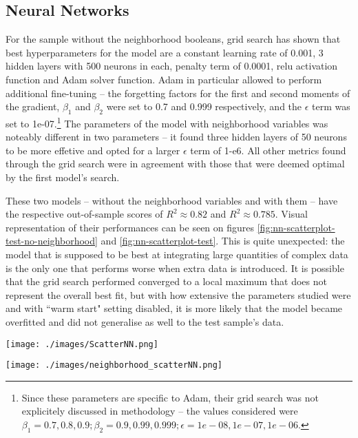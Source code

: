 \documentclass[12pt]{report}
\begin{document}
\subsection{Neural Networks}
For the sample without the neighborhood booleans, grid search has shown that best hyperparameters for the model are a constant learning rate of 0.001, 3 hidden layers with 500 neurons in each, penalty term of 0.0001, relu activation function and Adam solver function. Adam in particular allowed to perform additional fine-tuning -- the forgetting factors for the first and second moments of the gradient, $\beta_{1}$ and $\beta_{2}$ were set to 0.7 and 0.999 respectively, and the $\epsilon$ term was set to 1e-07.\footnote{Since these parameters are specific to Adam, their grid search was not explicitely discussed in methodology -- the values considered were $\beta_1=0.7, 0.8, 0.9; \beta_2=0.9, 0.99, 0.999; \epsilon=1e-08, 1e-07, 1e-06$.} The parameters of the model with neighborhood variables was noteably different in two parameters -- it found three hidden layers of 50 neurons to be more effetive and opted for a larger $\epsilon$ term of 1-e6. All other metrics found through the grid search were in agreement with those that were deemed optimal by the first model's search.

These two models -- without the neighborhood variables and with them -- have the respective out-of-sample scores of $R^2\approx0.82$ and $R^2\approx0.785$. Visual representation of their performances can be seen on figures \ref{fig:nn-scatterplot-test-no-neighborhood} and \ref{fig:nn-scatterplot-test}. This is quite unexpected: the model that is supposed to be best at integrating large quantities of complex data is the only one that performs worse when extra data is introduced. It is possible that the grid search performed converged to a local maximum that does not represent the overall best fit, but with how extensive the parameters studied were and with ``warm start" setting disabled, it is more likely that the model became overfitted and did not generalise as well to the test sample's data.



\begin{minipage}[t]{0.47\textwidth}
	\centering
	\texttt{[image: ./images/ScatterNN.png]}
	\label{fig:nn-scatterplot-test-no-neighborhood}
\end{minipage}
\begin{minipage}[t]{0.47\textwidth}
	\centering
	\texttt{[image: ./images/neighborhood\_scatterNN.png]}
	\label{fig:nn-scatterplot-test}
\end{minipage}
\end{document}
